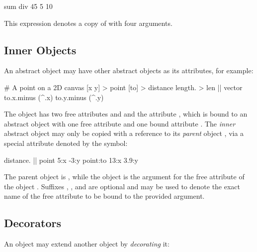 \begin{ffcode}
sum div 45 5 10
\end{ffcode}

This expression denotes a copy of  with four arguments.

\subsection{Inner Objects}

An abstract object may have other abstract objects as its attributes,
for example:

\begin{ffcode}
# A point on a 2D canvas
[x y] > point
  [to] > distance
    length. > len |$\label{ln:vector-length}$|
      vector
        to.x.minus (^.x)
        to.y.minus (^.y)
\end{ffcode}

The object  has two free attributes  and 
and the attribute , which is bound to an abstract
object with one free attribute  and one bound attribute .
The \emph{inner} abstract object  may only be copied
with a reference to its \emph{parent} object , via
a special attribute denoted by the \ff{\^{}} symbol:

\begin{ffcode}
distance. |$\label{ln:point-copy}$|
  point
    5:x
    -3:y
  point:to
    13:x
    3.9:y
\end{ffcode}

The parent object is , while the object 
is the argument for the free attribute  of the object .
Suffixes , , and  are optional and may be used
to denote the exact name of the free attribute to be bound to the
provided argument.

\subsection{Decorators}

An object may extend another object by \emph{decorating} it:


